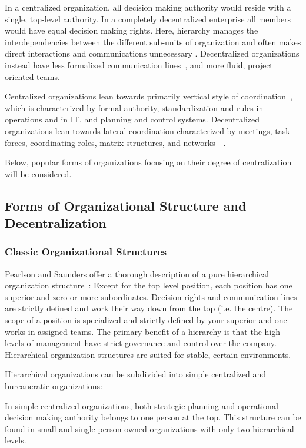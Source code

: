 In a centralized organization, all decision making authority would reside with a single, top-level authority. In a completely decentralized enterprise all members would have equal decision making rights. Here, hierarchy manages the interdependencies between the different sub-units of organization and often makes direct interactions and communications unnecessary \cite{thompson1967}.  Decentralized organizations instead have less formalized communication lines~\cite{pearlson2009}, and more fluid, project oriented teams.~\cite{applegate1988}

Centralized organizations lean towards primarily vertical style of coordination~\cite{Bolman2008}, which is characterized by formal authority, standardization and rules in operations and in IT, and planning and control systems. Decentralized organizations lean towards lateral coordination characterized by meetings, task forces, coordinating roles, matrix structures, and networks~~\cite{Bolman2008}. 

Below, popular forms of organizations focusing on their degree of centralization will be considered. 

\subsection{Forms of Organizational Structure and Decentralization}

\subsubsection{Classic Organizational Structures}

Pearlson and Saunders offer a thorough description of a pure hierarchical organization structure~\cite{pearlson2009}: Except for the top level position, each position has one superior and zero or more subordinates. Decision rights and communication lines are strictly defined and work their way down from the top (i.e. the centre). The scope of a position is specialized and strictly defined by your superior and one works in assigned teams. The primary benefit of a hierarchy is that the high levels of management have strict governance and control over the company. Hierarchical organization structures are suited for stable, certain environments. 

Hierarchical organizations can be subdivided into simple centralized and bureaucratic organizations:

In simple centralized organizations, both strategic planning and operational decision making authority belongs to one person at the top. This structure can be found in small and single-person-owned organizations with only two hierarchical levels. 

